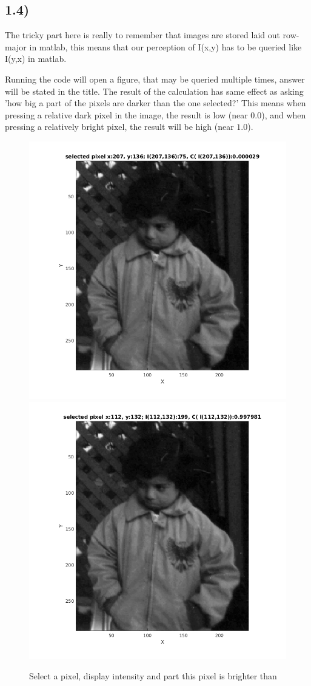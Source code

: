 \documentclass[a4paper]{article}
\begin{document}
\newpage
\subsection*{1.4)}

The tricky part here is really to remember that images are stored laid out row-major in matlab, this means that our perception of I(x,y) has to be queried like I(y,x) in matlab.

Running the code will open a figure, that may be queried multiple times, answer will be stated in the title.
The result of the calculation has same effect as asking 'how big a part of the pixels are darker than the one selected?'
This means when pressing a relative dark pixel in the image, the result is low (near $0.0$), and when pressing a relatively bright pixel, the result will be high (near $1.0$).

\vfill
\begin{figure}[h!]
  \centering
  \includegraphics[width=0.45\linewidth, trim={40 40 40 30 }, clip=true]{./1_4a.png}
  \includegraphics[width=0.45\linewidth, trim={40 40 40 30 }, clip=true]{./1_4b.png}
  \caption{Select a pixel, display intensity and part this pixel is brighter than}
  \label{fig:1.4}
\end{figure}
\end{document}
